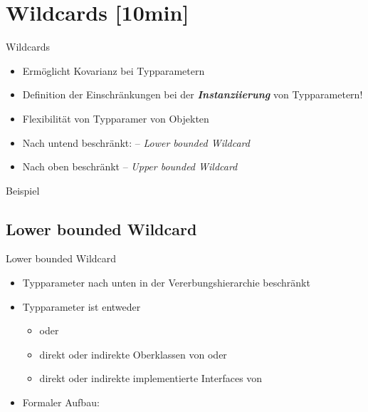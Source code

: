 \documentclass{../tuda-beamer}
\begin{document}
    \begin{frame}[c]
        
        
    \end{frame}


    \section{Wildcards [10min]}
    \label{sec:wildcards}
    \begin{frame}[c]{Wildcards}
        \begin{itemize}
            \item Ermöglicht Kovarianz bei Typparametern
            \item Definition der Einschränkungen bei der \textbf{\emph{Instanziierung}} von
            Typparametern!
            \item Flexibilität von Typparamer von Objekten
            \item Nach untend beschränkt:  -- \emph{Lower bounded Wildcard}
            \item Nach oben beschränkt  -- \emph{Upper bounded Wildcard}
        \end{itemize}
    \end{frame}

    \begin{frame}[c]{Beispiel}
        
    \end{frame}

    \subsection{Lower bounded Wildcard}
    \label{subsec:wildcards-lowerbound}
    \begin{frame}[c]{Lower bounded Wildcard}
        \begin{itemize}
            \item Typparameter nach unten in der Vererbungshierarchie beschränkt
            \item Typparameter ist entweder
            \begin{itemize}
                \item {} oder
                \item direkt oder indirekte Oberklassen von  oder
                \item direkt oder indirekte implementierte Interfaces von 
            \end{itemize}
            \item Formaler Aufbau: 
        \end{itemize}
    \end{frame}
\end{document}
